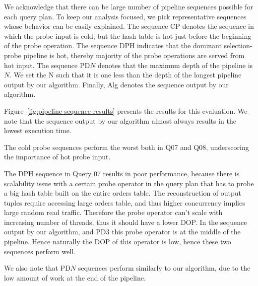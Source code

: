 We acknowledge that there can be large number of pipeline sequences possible for each query plan. 
To keep our analysis focused, we pick representative sequences whose behavior can be easily explained.
The sequence CP denotes the sequence in which the probe input is cold, but the hash table is hot just before the beginning of the probe operation. 
The sequence DPH indicates that the dominant selection-probe pipeline is hot, thereby majority of the probe operations are served from hot input. 
The sequence PD$N$ denotes that the maximum depth of the pipeline is $N$. 
We set the N such that it is one less than the depth of the longest pipeline output by our algorithm.
Finally, Alg denotes the sequence output by our algorithm.

Figure~\ref{fig:pipeline-sequence-results} presents the results for this evaluation.
We note that the sequence output by our algorithm almost always results in the lowest execution time. 

The cold probe sequences perform the worst both in Q07 and Q08, underscoring the importance of hot probe input. 

The DPH sequence in Query 07 results in poor performance, because there is scalability issue with a certain probe operator in the query plan that has to probe a big hash table built on the entire orders table.
The reconstruction of output tuples require accessing large orders table, and thus higher concurrency implies large random read traffic. 
Therefore the probe operator can't scale with increasing number of threads, thus it should have a lower DOP.
In the sequence output by our algorithm, and PD3 this probe operator is at the middle of the pipeline.
Hence naturally the DOP of this operator is low, hence these two sequences perform well.

We also note that PD$N$ sequences perform similarly to our algorithm, due to the low amount of work at the end of the pipeline.
